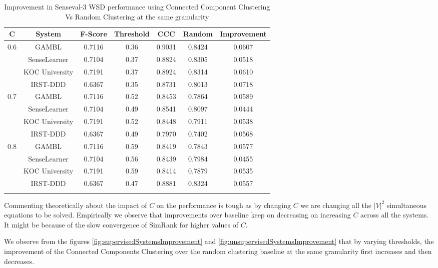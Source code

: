 
\begin{center}
\begin{longtable}{|c| c || c | c | c | c | c |}      
    \hline
    C & \textbf{System} & \textbf{F-Score} & \textbf{Threshold} & \textbf{CCC} & \textbf{Random} & \textbf{Improvement} \\ \hline
    \multirow{4}{*}{0.6} & GAMBL & 0.7116 & 0.36 & 0.9031 & 0.8424 & 0.0607 \\ \cline{2-7}
    & SenseLearner & 0.7104 & 0.37 & 0.8824 & 0.8305 & 0.0518 \\ \cline{2-7}
    & KOC University & 0.7191 & 0.37 & 0.8924 & 0.8314 & 0.0610 \\ \cline{2-7}
    & IRST-DDD & 0.6367 & 0.35 & 0.8731 & 0.8013 & 0.0718 \\ \cline{2-7}
    \hline    
    \multirow{4}{*}{0.7} & GAMBL & 0.7116 & 0.52 & 0.8453 & 0.7864 & 0.0589 \\ \cline{2-7}
    & SenseLearner & 0.7104 & 0.49 & 0.8541 & 0.8097 & 0.0444 \\ \cline{2-7}
    & KOC University & 0.7191 & 0.52 & 0.8448 & 0.7911 & 0.0538 \\ \cline{2-7}
    & IRST-DDD & 0.6367 & 0.49 & 0.7970 & 0.7402 & 0.0568 \\ \cline{2-7}
    \hline    
    \multirow{4}{*}{0.8} &GAMBL & 0.7116 & 0.59 & 0.8419 & 0.7843 & 0.0577 \\ \cline{2-7}
    & SenseLearner & 0.7104 & 0.56 & 0.8439 & 0.7984 & 0.0455 \\ \cline{2-7}
    & KOC University & 0.7191 & 0.59 & 0.8414 & 0.7879 & 0.0535 \\ \cline{2-7}
    & IRST-DDD & 0.6367 & 0.47& 0.8881 & 0.8324 & 0.0557 \\
    \hline
    \caption{Improvement in Senseval-3 WSD performance using Connected Component Clustering Vs Random Clustering at the same granularity}
  \label{tab:wsdImprovement}
\end{longtable}
\end{center}

Commenting theoretically about the impact of $C$ on the performance is tough as by changing $C$ we are changing all the ${|V|}^2$ simultaneous equations to be solved. Empirically we observe that improvements over baseline keep on decreasing on increasing $C$ across all the systems. It might be because of the slow convergence of SimRank for higher values of $C$.

We observe from the figures \ref{fig:supervisedSystemsImprovement} and \ref{fig:unsupervisedSystemsImprovement} that by varying thresholds, the improvement of the Connected Components Clustering over the random clustering baseline at the same granularity first increases and then decreases.


